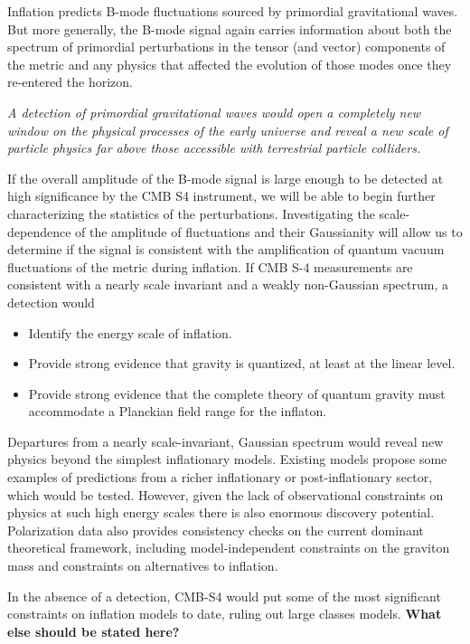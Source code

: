 Inflation predicts B-mode fluctuations  sourced by primordial gravitational waves. But more generally, the B-mode signal again carries information about both the spectrum of primordial perturbations in the tensor (and vector) components of the metric and any physics that affected the evolution of those modes once they re-entered the horizon.  

{\it A detection of primordial gravitational waves would open a completely new window on the physical processes of the early universe and reveal a new scale of particle physics far above those accessible with terrestrial particle colliders. }

If the overall amplitude of the B-mode signal is large enough to be detected at high significance by the CMB S4 instrument, we will be able to begin further characterizing the statistics of the perturbations. Investigating the scale-dependence of the amplitude of fluctuations and their Gaussianity will allow us to determine if the signal is consistent with the amplification of quantum vacuum fluctuations of the metric during inflation. If CMB S-4 measurements are consistent with a nearly scale invariant and a weakly non-Gaussian spectrum, a detection would
\begin{itemize}
 \item Identify the energy scale of inflation. 
  \item Provide strong evidence that gravity is quantized, at least at the linear level.
 \item Provide strong evidence that the complete theory of quantum gravity must accommodate a Planckian field range for the inflaton.
\end{itemize}

Departures from a nearly scale-invariant, Gaussian spectrum would reveal new physics beyond the simplest inflationary models. Existing models propose some examples of predictions from a richer inflationary or post-inflationary sector, which would be tested. However, given the lack of observational constraints on physics at such high energy scales there is also enormous discovery potential. Polarization data also provides consistency checks on the current dominant theoretical framework, including model-independent constraints on the graviton mass and constraints on alternatives to inflation.

In the absence of a detection, CMB-S4 would put some of the most significant constraints on inflation models to date, ruling out large classes models. {\bf What else should be stated here?}

